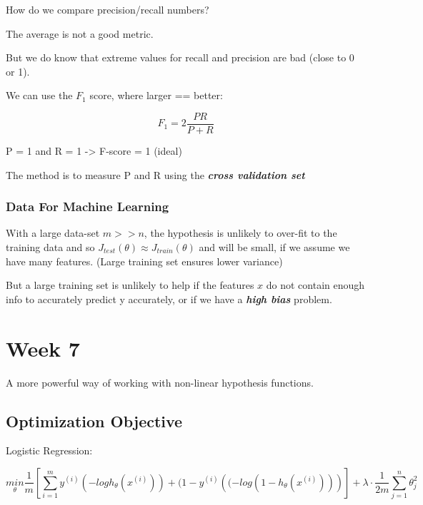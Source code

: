 \documentclass{article}
\begin{document}
How do we compare precision/recall numbers?

The average is not a good metric.

But we do know that extreme values for recall and precision are bad (close to 0 or 1).

\hspace{}


We can use the $F_1$ score, where larger == better:

\begin{equation}
    F_1 = 2 \frac{PR}{P+R}
\end{equation}

P = 1 and R = 1 -> F-score = 1 (ideal)

The method is to measure P and R using the \textbf{\textit{cross validation set}}



\subsubsection{Data For Machine Learning}

With a large data-set  $m >> n$, the hypothesis is unlikely to over-fit to the training data and so $J_{test} (\theta) \approx J_{train} (\theta)$ and will be small, if we assume we have many features. (Large training set ensures lower variance)

But a large training set is unlikely to help if the features $x$ do not contain enough info to accurately predict y accurately, or if we have a \textbf{\textit{high bias}} problem.





\section{Week 7}

A more powerful way of working with non-linear hypothesis functions. 

\subsection{Optimization Objective}



Logistic Regression:

\begin{equation}
    \underset{\theta}{min} \frac{1}{m} \left[ \sum_{i=1}^m y^{(i)} \left(-log h_{\theta} (x^{(i)}) \right) + (1 - y^{(i)} \left( (-log(1 - h_{\theta} (x^{(i)})) \right) \right] + \lambda \cdot \frac{1}{2m} \sum_{j=1}^n \theta_j^2
\end{equation}
\end{document}
